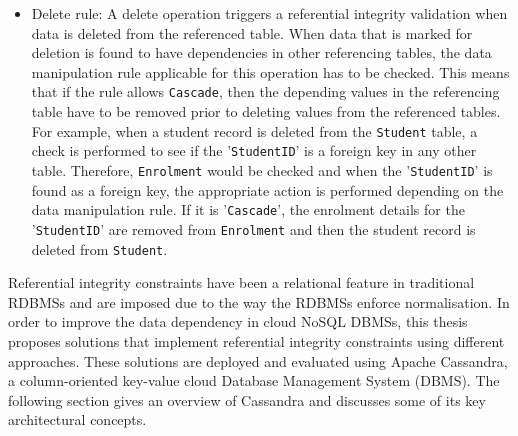 \begin{itemize}
		\item Delete rule: A delete operation triggers a referential integrity
		validation when data is deleted from the referenced table.  When data that is
		marked for deletion is found to have dependencies in other referencing tables,  
		the data manipulation rule applicable for this operation has to be checked. 
		This means that if the rule allows \texttt{Cascade},   then the depending values
		in the referencing table have to be removed prior to deleting values from the
		referenced tables.  For example,   when a student record is deleted from the
		\texttt{Student} table,   a check is performed to see if the
		'\texttt{StudentID}' is a foreign key in any other table.  Therefore,  
		\texttt{Enrolment} would be checked and when the '\texttt{StudentID}' is found
		as a foreign key,   the appropriate action is performed depending on the data
		manipulation rule.  If it is '\texttt{Cascade}',   the enrolment details for the
		'\texttt{StudentID}' are removed from \texttt{Enrolment} and then the student
		record is deleted from
		\texttt{Student}. 
	
	\end{itemize}

Referential integrity constraints have been a relational feature in traditional
\acp{RDBMS} and are imposed due to the way the \acp{RDBMS} enforce
normalisation.
In order to improve the data dependency in cloud \ac{NoSQL} \acp{DBMS},   this
thesis proposes solutions that implement referential integrity constraints using
different approaches. These solutions are
deployed and evaluated using Apache Cassandra, a column-oriented key-value cloud
Database Management System (DBMS). The following section gives an overview of
Cassandra and discusses some of its key architectural concepts.
 

